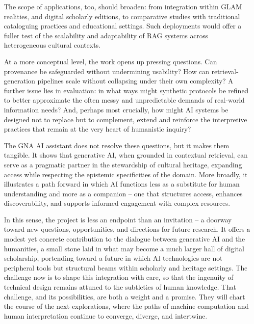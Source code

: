 \begin{spacing}{1.5}
The scope of applications, too, should broaden: from integration within GLAM realities, and digital scholarly editions, to comparative studies with traditional cataloguing practices and educational settings. Such deployments would offer a fuller test of the scalability and adaptability of RAG systems across heterogeneous cultural contexts.

At a more conceptual level, the work opens up pressing questions. Can provenance be safeguarded without undermining usability? How can retrieval-generation pipelines scale without collapsing under their own complexity? A further issue lies in evaluation: in what ways might synthetic protocols be refined to better approximate the often messy and unpredictable demands of real-world information needs? And, perhaps most crucially, how might AI systems be designed not to replace but to complement, extend and reinforce the interpretive practices that remain at the very heart of humanistic inquiry?

The GNA AI assistant does not resolve these questions, but it makes them tangible. It shows that generative AI, when grounded in contextual retrieval, can serve as a pragmatic partner in the stewardship of cultural heritage, expanding access while respecting the epistemic specificities of the domain. More broadly, it illustrates a path forward in which AI functions less as a substitute for human understanding and more as a companion -- one that structures access, enhances discoverability, and supports informed engagement with complex resources.

In this sense, the project is less an endpoint than an invitation -- a doorway toward new questions, opportunities, and directions for future research. It offers a modest yet concrete contribution to the dialogue between generative AI and the humanities, a small stone laid in what may become a much larger hall of digital scholarship, portending toward a future in which AI technologies are not peripheral tools but structural beams within scholarly and heritage settings. The challenge now is to shape this integration with care, so that the ingenuity of technical design remains attuned to the subtleties of human knowledge. That challenge, and its possibilities, are both a weight and a promise. They will chart the course of the next explorations, where the paths of machine computation and human interpretation continue to converge, diverge, and intertwine.


\end{spacing}